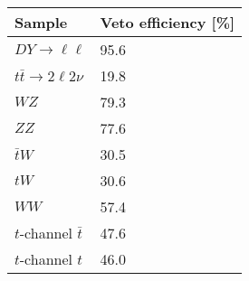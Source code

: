 \begin{tabular}{l|l}
Sample & Veto efficiency [\%]\\
\hline
$DY\rightarrow\ell\ell$ & 95.6\\
$t\bar{t}\rightarrow2\ell2\nu$ & 19.8\\
$WZ$ & 79.3\\
$ZZ$ & 77.6\\
$\bar{t}W$ & 30.5\\
$tW$ & 30.6\\
$WW$ & 57.4\\
$t$-channel $\bar{t}$ & 47.6\\
$t$-channel $t$ & 46.0\\
\end{tabular}
